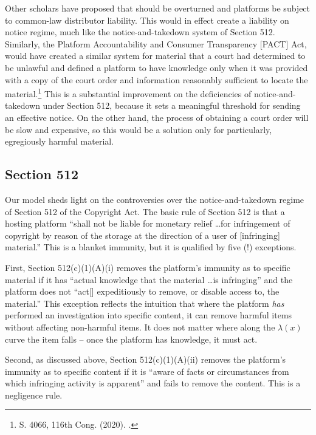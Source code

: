 Other scholars have proposed that  should be overturned and platforms be subject to common-law distributor liability. This would in effect create a liability on notice regime, much like the notice-and-takedown system of Section 512. Similarly, the Platform Accountability and Consumer Transparency [PACT] Act, would have created a similar system for material that a court had determined to be unlawful and defined a platform to have knowledge only when it was provided with a copy of the court order and information reasonably sufficient to locate the material.\footnote{S. 4066, 116th Cong. (2020). .} This is a substantial improvement on the deficiencies of notice-and-takedown under Section 512, because it sets a meaningful threshold for sending an effective notice. On the other hand, the process of obtaining a court order will be slow and expensive, so this would be a solution only for particularly, egregiously harmful material.


% 
\subsection{Section 512}

Our model sheds light on the controversies over the notice-and-takedown regime of Section 512 of the Copyright Act. The basic rule of Section 512 is that a hosting platform ``shall not be liable for monetary relief \ldots for infringement of copyright by reason of the storage at the direction of a user of [infringing] material.'' This is a blanket immunity, but it is qualified by five (!) exceptions.

First, Section 512(c)(1)(A)(i) removes the platform's immunity as to specific material if it has ``actual knowledge that the material \ldots is infringing'' and the platform does not ``act[] expeditiously to remove, or disable access to, the material.'' This exception reflects the intuition that where the platform \emph{has} performed an investigation into specific content, it can remove harmful items without affecting non-harmful items. It does not matter where along the $\lambda(x)$ curve the item falls -- once the platform has knowledge, it must act. 

Second, as discussed above, Section 512(c)(1)(A)(ii) removes the platform's immunity as to specific content if it is ``aware of facts or circumstances from which infringing activity is apparent'' and fails to remove the content. This is a negligence rule.

